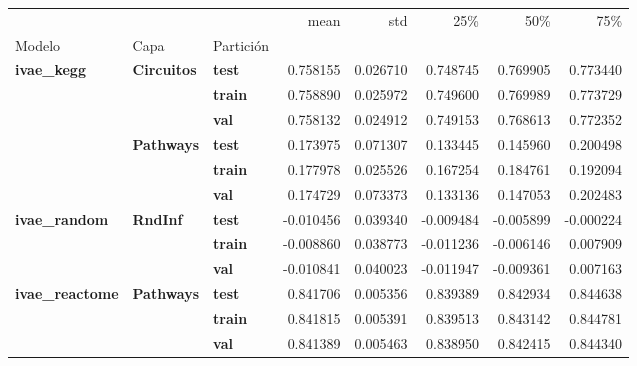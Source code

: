 \begin{tabular}{lllrrrrr}
\toprule
 &  &  & mean & std & 25\% & 50\% & 75\% \\
Modelo & Capa & Partición &  &  &  &  &  \\
\midrule
\multirow[t]{6}{*}{\textbf{ivae\_kegg}} & \multirow[t]{3}{*}{\textbf{Circuitos}} & \textbf{test} & 0.758155 & 0.026710 & 0.748745 & 0.769905 & 0.773440 \\
\textbf{} & \textbf{} & \textbf{train} & 0.758890 & 0.025972 & 0.749600 & 0.769989 & 0.773729 \\
\textbf{} & \textbf{} & \textbf{val} & 0.758132 & 0.024912 & 0.749153 & 0.768613 & 0.772352 \\
\cline{2-8}
\textbf{} & \multirow[t]{3}{*}{\textbf{Pathways}} & \textbf{test} & 0.173975 & 0.071307 & 0.133445 & 0.145960 & 0.200498 \\
\textbf{} & \textbf{} & \textbf{train} & 0.177978 & 0.025526 & 0.167254 & 0.184761 & 0.192094 \\
\textbf{} & \textbf{} & \textbf{val} & 0.174729 & 0.073373 & 0.133136 & 0.147053 & 0.202483 \\
\cline{1-8} \cline{2-8}
\multirow[t]{3}{*}{\textbf{ivae\_random}} & \multirow[t]{3}{*}{\textbf{RndInf}} & \textbf{test} & -0.010456 & 0.039340 & -0.009484 & -0.005899 & -0.000224 \\
\textbf{} & \textbf{} & \textbf{train} & -0.008860 & 0.038773 & -0.011236 & -0.006146 & 0.007909 \\
\textbf{} & \textbf{} & \textbf{val} & -0.010841 & 0.040023 & -0.011947 & -0.009361 & 0.007163 \\
\cline{1-8} \cline{2-8}
\multirow[t]{3}{*}{\textbf{ivae\_reactome}} & \multirow[t]{3}{*}{\textbf{Pathways}} & \textbf{test} & 0.841706 & 0.005356 & 0.839389 & 0.842934 & 0.844638 \\
\textbf{} & \textbf{} & \textbf{train} & 0.841815 & 0.005391 & 0.839513 & 0.843142 & 0.844781 \\
\textbf{} & \textbf{} & \textbf{val} & 0.841389 & 0.005463 & 0.838950 & 0.842415 & 0.844340 \\
\cline{1-8} \cline{2-8}
\bottomrule
\end{tabular}
